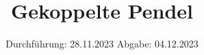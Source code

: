 

\subject{V106}
\title{Gekoppelte Pendel}
\date{%
  Durchführung: 28.11.2023
  \hspace{3em}
  Abgabe: 04.12.2023
}



\maketitle
\thispagestyle{empty}
\tableofcontents
\newpage






\printbibliography{}
\appendix
\setcounter{secnumdepth}{0}

